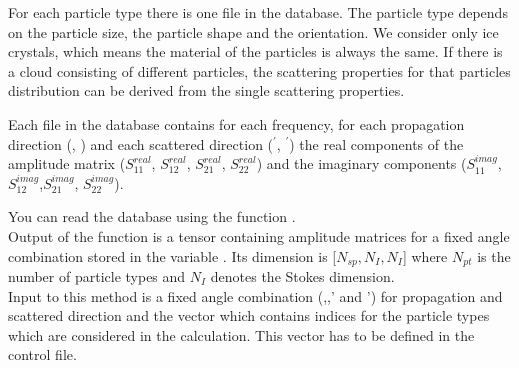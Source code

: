 For each particle type there is one file in the database.
The particle type depends on the particle size, the particle shape and the
orientation. We consider only ice crystals, which means the material of the
particles is always the same. If there is a cloud consisting of
different particles, the scattering properties for that particles
distribution can be derived from the single scattering properties.

Each file in the database contains for each frequency, for each propagation
direction (\ScaZa, \ScaAa) and each scattered direction
 (\ScaZa$^\prime$, \ScaAa$^\prime$) the real
components of the amplitude matrix ($S^{real}_{11}$, $S^{real}_{12}$,
$S^{real}_{21}$, $S^{real}_{22}$) and the imaginary components
($S^{imag}_{11}$, $S^{imag}_{12}$,$S^{imag}_{21}$, $S^{imag}_{22}$).

You can read the database using the function
.\\
Output of the function is a tensor containing amplitude matrices for
a fixed angle combination stored in the variable
. Its dimension is [$N_{sp}, N_{I}, N_{I}$]
where $N_{pt}$ is the number of particle
types  and $N_{I}$ denotes the Stokes dimension.\\
Input to this method is a fixed angle
combination  (,,' and
') for propagation and scattered direction and the vector
 which contains indices for the  particle types
which are considered in the calculation. This vector has to be defined
in the control file.


\label{sec:scattering:gen_atmprop}

\label{sec:scattering:gen_ext}

\label{sec:scattering:ext_mat_agenda}

